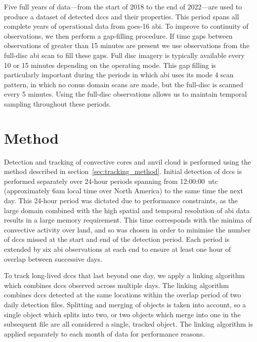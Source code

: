 Five full years of data---from the start of 2018 to the end of 2022---are used to produce a dataset of detected \acrshort{dcc}s and their properties.
This period spans all complete years of operational data from \acrshort{goes}-16 \acrshort{abi}.
To improve to continuity of observations, we then perform a gap-filling procedure.
If time gaps between observations of greater than 15 minutes are present we use observations from the full-disc \acrshort{abi} scan to fill these gaps.
Full disc imagery is typically available every 10 or 15 minutes depending on the operating mode.
This gap filling is particularly important during the periods in which \acrshort{abi} uses its mode 4 scan pattern, in which no \acrshort{conus} domain scans are made, but the full-disc is scanned every 5 minutes.
Using the full-disc observations allows us to maintain temporal sampling throughout these periods.


\section{Method} \label{sec:conus_method}

Detection and tracking of convective cores and anvil cloud is performed using the method described in section~\ref{sec:tracking_method}.
Initial detection of \acrshort{dcc}s is performed separately over 24-hour periods spanning from 12:00:00~\acrshort{utc} (approximately 6am local time over North America) to the same time the next day.
This 24-hour period was dictated due to performance constraints, as the large domain combined with the high spatial and temporal resolution of \acrshort{abi} data results in a large memory requirement.
This time corresponds with the minima of convective activity over land, and so was chosen in order to minimise the number of \acrshort{dcc}s missed at the start and end of the detection period.
Each period is extended by six \acrshort{abi} observations at each end to ensure at least one hour of overlap between successive days.

To track long-lived \acrshort{dcc}s that last beyond one day, we apply a linking algorithm which combines \acrshort{dcc}s observed across multiple days.
The linking algorithm combines \acrshort{dcc}s detected at the same locations within the overlap period of two daily detection files.
Splitting and merging of objects is taken into account, so a single object which splits into two, or two objects which merge into one in the subsequent file are all considered a single, tracked object.
The linking algorithm is applied separately to each month of data for performance reasons.


